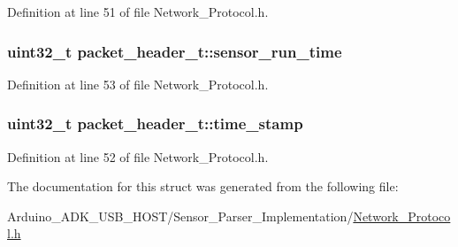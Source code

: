Definition at line 51 of file Network\-\_\-\-Protocol.\-h.

\hypertarget{structpacket__header__t_a7e0279ebfb2fa24ebab0891c974cba90}{
\subsubsection[{sensor\-\_\-run\-\_\-time}]{\setlength{\rightskip}{0pt plus 5cm}uint32\-\_\-t packet\-\_\-header\-\_\-t\-::sensor\-\_\-run\-\_\-time}}\label{structpacket__header__t_a7e0279ebfb2fa24ebab0891c974cba90}


Definition at line 53 of file Network\-\_\-\-Protocol.\-h.

\hypertarget{structpacket__header__t_a71efd9461faa2455de17c2fc5728fc06}{
\subsubsection[{time\-\_\-stamp}]{\setlength{\rightskip}{0pt plus 5cm}uint32\-\_\-t packet\-\_\-header\-\_\-t\-::time\-\_\-stamp}}\label{structpacket__header__t_a71efd9461faa2455de17c2fc5728fc06}


Definition at line 52 of file Network\-\_\-\-Protocol.\-h.



The documentation for this struct was generated from the following file\-:\begin{DoxyCompactItemize}
\item 
Arduino\-\_\-\-A\-D\-K\-\_\-\-U\-S\-B\-\_\-\-H\-O\-S\-T/\-Sensor\-\_\-\-Parser\-\_\-\-Implementation/\hyperlink{_network___protocol_8h}{Network\-\_\-\-Protocol.\-h}\end{DoxyCompactItemize}
